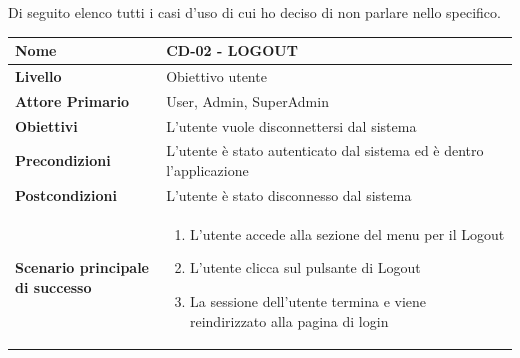 Di seguito elenco tutti i casi d'uso di cui ho deciso di non parlare nello specifico.

\begin{center}
    \begin{tabular}{|p{0.3\linewidth}|p{0.7\linewidth}|}
    \hline
    \rowcolor{Blue}
    \textbf{Nome} & CD-02 - LOGOUT \\
    \hline
    \rowcolor{DarkBlue}
    \textbf{Livello} & Obiettivo utente \\
    \hline
    \rowcolor{LightBlue}
    \textbf{Attore Primario} & User, Admin, SuperAdmin \\
    \hline
    \rowcolor{LightBlue}
    \textbf{Obiettivi} & L'utente vuole disconnettersi dal sistema \\
    \hline
    \rowcolor{Blue}
    \textbf{Precondizioni} & L’utente è stato autenticato dal sistema ed è dentro l'applicazione \\
    \hline
    \rowcolor{LightBlue}
    \textbf{Postcondizioni} & L’utente è stato disconnesso dal sistema \\
    \hline
    \rowcolor{LighterBlue}
        \begin{center}
        \textbf{Scenario principale di successo}
    \end{center} 
    & 
    \begin{enumerate}
        \item L’utente accede alla sezione del menu per il Logout
        \item L’utente clicca sul pulsante di Logout
        \item La sessione dell’utente termina e viene reindirizzato alla pagina di login
    \end{enumerate}
    \\
    \hline
    \end{tabular}
\end{center}

